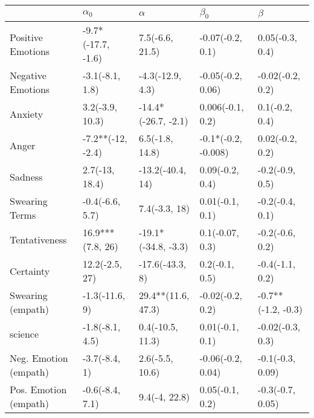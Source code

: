 \begin{tabular}{lllll}
\toprule
{} &          $\alpha_0$ &             $\alpha$ &            $\beta_0$ &             $\beta$ \\
\midrule
Positive Emotions     &  -9.7*(-17.7, -1.6) &      7.5(-6.6, 21.5) &     -0.07(-0.2, 0.1) &     0.05(-0.3, 0.4) \\
Negative Emotions     &     -3.1(-8.1, 1.8) &     -4.3(-12.9, 4.3) &    -0.05(-0.2, 0.06) &    -0.02(-0.2, 0.2) \\
Anxiety               &     3.2(-3.9, 10.3) &  -14.4*(-26.7, -2.1) &     0.006(-0.1, 0.2) &      0.1(-0.2, 0.4) \\
Anger                 &   -7.2**(-12, -2.4) &      6.5(-1.8, 14.8) &  -0.1*(-0.2, -0.008) &     0.02(-0.2, 0.2) \\
Sadness               &      2.7(-13, 18.4) &     -13.2(-40.4, 14) &      0.09(-0.2, 0.4) &     -0.2(-0.9, 0.5) \\
Swearing Terms        &     -0.4(-6.6, 5.7) &        7.4(-3.3, 18) &      0.01(-0.1, 0.1) &     -0.2(-0.4, 0.1) \\
Tentativeness         &    16.9***(7.8, 26) &  -19.1*(-34.8, -3.3) &      0.1(-0.07, 0.3) &     -0.2(-0.6, 0.2) \\
Certainty             &      12.2(-2.5, 27) &      -17.6(-43.3, 8) &       0.2(-0.1, 0.5) &     -0.4(-1.1, 0.2) \\
Swearing (empath)     &      -1.3(-11.6, 9) &   29.4**(11.6, 47.3) &     -0.02(-0.2, 0.2) &  -0.7**(-1.2, -0.3) \\
science               &     -1.8(-8.1, 4.5) &     0.4(-10.5, 11.3) &      0.01(-0.1, 0.1) &    -0.02(-0.3, 0.3) \\
Neg. Emotion (empath) &       -3.7(-8.4, 1) &      2.6(-5.5, 10.6) &    -0.06(-0.2, 0.04) &    -0.1(-0.3, 0.09) \\
Pos. Emotion (empath) &     -0.6(-8.4, 7.1) &        9.4(-4, 22.8) &      0.05(-0.1, 0.2) &    -0.3(-0.7, 0.05) \\
\bottomrule
\end{tabular}

